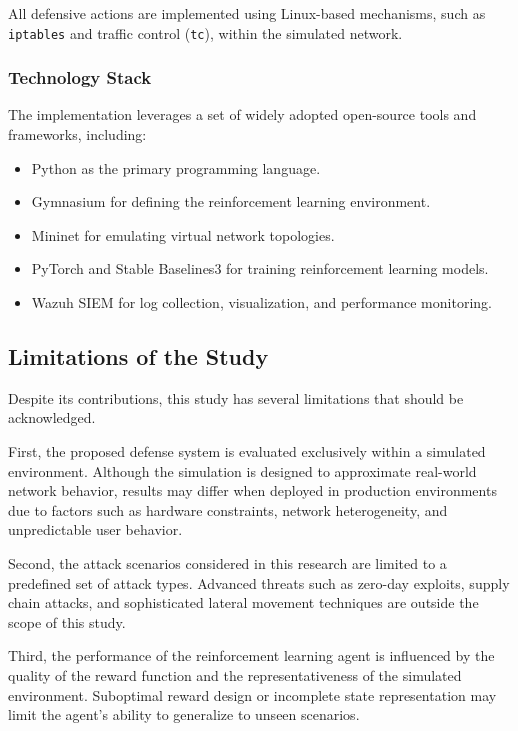 \documentclass[12pt,a4paper]{report}
\begin{document}
All defensive actions are implemented using Linux-based mechanisms, such as \texttt{iptables} and traffic control (\texttt{tc}), within the simulated network.

\subsubsection{Technology Stack}

The implementation leverages a set of widely adopted open-source tools and frameworks, including:

\begin{itemize}
    \item Python as the primary programming language.
    \item Gymnasium for defining the reinforcement learning environment.
    \item Mininet for emulating virtual network topologies.
    \item PyTorch and Stable Baselines3 for training reinforcement learning models.
    \item Wazuh SIEM for log collection, visualization, and performance monitoring.
\end{itemize}

\subsection{Limitations of the Study}

Despite its contributions, this study has several limitations that should be acknowledged.

First, the proposed defense system is evaluated exclusively within a simulated environment.
Although the simulation is designed to approximate real-world network behavior, results may differ when deployed in production environments due to factors such as hardware constraints, network heterogeneity, and unpredictable user behavior.

Second, the attack scenarios considered in this research are limited to a predefined set of attack types.
Advanced threats such as zero-day exploits, supply chain attacks, and sophisticated lateral movement techniques are outside the scope of this study.

Third, the performance of the reinforcement learning agent is influenced by the quality of the reward function and the representativeness of the simulated environment.
Suboptimal reward design or incomplete state representation may limit the agent’s ability to generalize to unseen scenarios.
\end{document}

